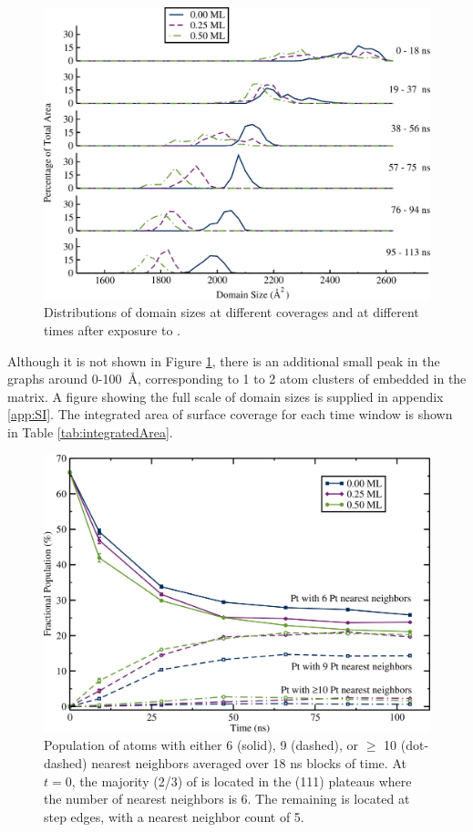 \begin{figure}[p!]
\includegraphics[width=\linewidth]{../figures/chap3/domains_Pt_110ns.pdf}
\caption{Distributions of  domain sizes at different 
  coverages and at different times after exposure to .}
\label{fig:domainAreasPt}
\end{figure}

Although it is not shown in Figure \ref{fig:domainAreasPt}, there is
an additional small peak in the  graphs around 0-100~\AA,
corresponding to 1 to 2 atom clusters of  embedded in the
 matrix.  A figure showing the full scale of domain sizes is
supplied in appendix \ref{app:SI}.  The integrated area of
surface coverage for each time window is shown in Table
\ref{tab:integratedArea}.

\begin{figure}[p!]
  \includegraphics[width=\linewidth]{../figures/chap3/nn.pdf}
  \caption{Population of  atoms with either 6 (solid), 9
    (dashed), or $\ge$ 10 (dot-dashed)  nearest neighbors
    averaged over 18 ns blocks of time.  At $t=0$, the majority
    (2/3) of  is located in the (111) plateaus where
    the number of  nearest neighbors is 6. The remaining
     is located at step edges, with a nearest neighbor 
    count of 5.} \label{fig:nearestNeighbors}
\end{figure}

